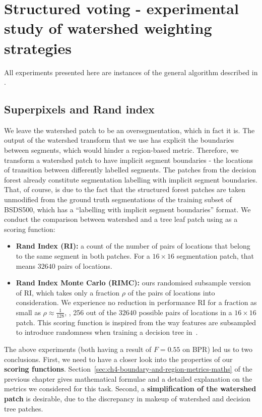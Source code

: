 \section[Structured voting]{Structured voting - experimental study of watershed weighting strategies}
\label{sec:ch5-structured-voting}
All experiments presented here are instances of the general algorithm described in .

\subsection*{Superpixels and Rand index}
We leave the watershed patch to be an oversegmentation, which in fact it is. The output of the watershed transform that we use has explicit the boundaries between segments, which would hinder a region-based metric. Therefore, we transform a watershed patch to have implicit segment boundaries - the locations of transition between differently labelled segments. 
The patches from the decision forest already constitute segmentation labelling with implicit segment boundaries. That, of course, is due to the fact that the structured forest patches are taken unmodified from the ground truth segmentations of the training subset of BSDS500, which has a ``labelling with implicit segment boundaries'' format. We conduct the comparison between watershed and a tree leaf patch using as a scoring function:

\begin{itemize}
 \item{\bf Rand Index (RI):} a count of the number of pairs of locations that belong to the same segment in both patches. For a $16\times16$ segmentation patch, that means $32 640$ pairs of locations.
 \item{\bf Rand Index Monte Carlo (RIMC):} ours randomised subsample version of RI, which takes only a fraction $\rho$ of the pairs of locations into consideration. We experience no reduction in performance \wrt RI for a fraction as small as $\rho\approx\frac{1}{128}$, \ie, 256 out of the $32 640$ possible pairs of locations in a $16 \times 16$ patch. This scoring function is inspired from the way features are subsampled to introduce randomness when training a decision tree in~\cite{DollarICCV13edges,Dollar2013toolbox}.
\end{itemize}

The above experiments (both having a result of $F=0.55$ on BPR) led us to two conclusions. First, we need to have a closer look into the properties of our \textbf{scoring functions}. Section~\ref{sec:ch4-boundary-and-region-metrics-maths} of the previous chapter gives mathematical formulae and a detailed explanation on the metrics we considered for this task. Second, a \textbf{simplification of the watershed patch} is desirable, due to the discrepancy %
in makeup %
of watershed and decision tree patches.

